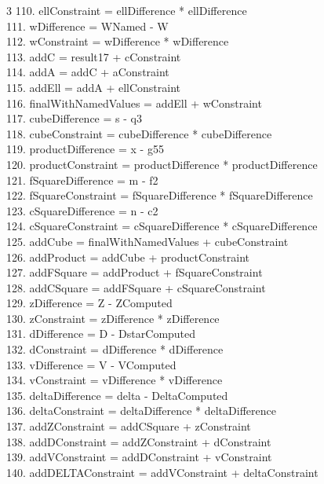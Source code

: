 \documentclass[10pt]{article}
\begin{document}
\begin{multicols}{3}
110. ellConstraint = ellDifference * ellDifference\\
111. wDifference = WNamed - W\\
112. wConstraint = wDifference * wDifference\\
113. addC = result17 + cConstraint\\
114. addA = addC + aConstraint\\
115. addEll = addA + ellConstraint\\
116. finalWithNamedValues = addEll + wConstraint\\
117. cubeDifference = s - q3\\
118. cubeConstraint = cubeDifference * cubeDifference\\
119. productDifference = x - g55\\
120. productConstraint = productDifference * productDifference\\
121. fSquareDifference = m - f2\\
122. fSquareConstraint = fSquareDifference * fSquareDifference\\
123. cSquareDifference = n - c2\\
124. cSquareConstraint = cSquareDifference * cSquareDifference\\
125. addCube = finalWithNamedValues + cubeConstraint\\
126. addProduct = addCube + productConstraint\\
127. addFSquare = addProduct + fSquareConstraint\\
128. addCSquare = addFSquare + cSquareConstraint\\
129. zDifference = Z - ZComputed\\
130. zConstraint = zDifference * zDifference\\
131. dDifference = D - DstarComputed\\
132. dConstraint = dDifference * dDifference\\
133. vDifference = V - VComputed\\
134. vConstraint = vDifference * vDifference\\
135. deltaDifference = delta - DeltaComputed\\
136. deltaConstraint = deltaDifference * deltaDifference\\
137. addZConstraint = addCSquare + zConstraint\\
138. addDConstraint = addZConstraint + dConstraint\\
139. addVConstraint = addDConstraint + vConstraint\\
140. addDELTAConstraint = addVConstraint + deltaConstraint\\

\end{multicols}
\end{document}
